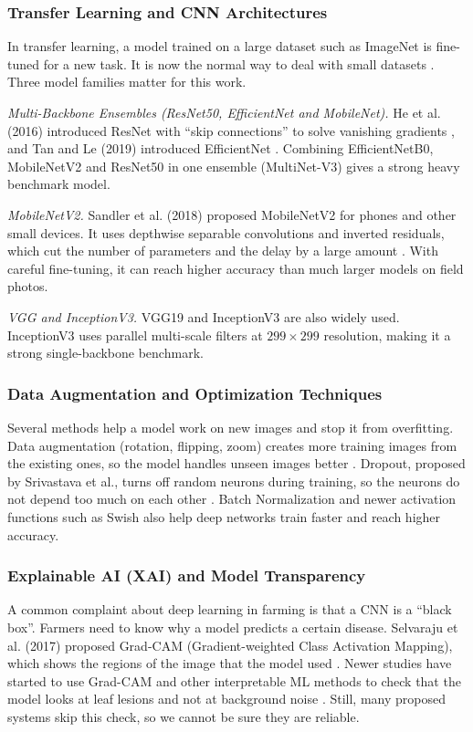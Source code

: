 \subsubsection{Transfer Learning and CNN Architectures}
In transfer learning, a model trained on a large dataset such as ImageNet is fine-tuned for a new task. It is now the normal way to deal with small datasets \cite{pan2010survey}. Three model families matter for this work.

\textit{Multi-Backbone Ensembles (ResNet50, EfficientNet and MobileNet).} He et al. (2016) introduced ResNet with ``skip connections'' to solve vanishing gradients \cite{he2016deep}, and Tan and Le (2019) introduced EfficientNet \cite{tan2019efficientnet}. Combining EfficientNetB0, MobileNetV2 and ResNet50 in one ensemble (MultiNet-V3) gives a strong heavy benchmark model.

\textit{MobileNetV2.} Sandler et al. (2018) proposed MobileNetV2 for phones and other small devices. It uses depthwise separable convolutions and inverted residuals, which cut the number of parameters and the delay by a large amount \cite{sandler2018mobilenetv2}. With careful fine-tuning, it can reach higher accuracy than much larger models on field photos.

\textit{VGG and InceptionV3.} VGG19 \cite{simonyan2015very} and InceptionV3 \cite{szegedy2016rethinking} are also widely used. InceptionV3 uses parallel multi-scale filters at $299 \times 299$ resolution, making it a strong single-backbone benchmark.

\subsubsection{Data Augmentation and Optimization Techniques}
Several methods help a model work on new images and stop it from overfitting. Data augmentation (rotation, flipping, zoom) creates more training images from the existing ones, so the model handles unseen images better \cite{shorten2019survey}. Dropout, proposed by Srivastava et al., turns off random neurons during training, so the neurons do not depend too much on each other \cite{srivastava2014dropout}. Batch Normalization \cite{ioffe2015batch} and newer activation functions such as Swish \cite{ramachandran2017swish} also help deep networks train faster and reach higher accuracy.

\subsubsection{Explainable AI (XAI) and Model Transparency}
A common complaint about deep learning in farming is that a CNN is a ``black box''. Farmers need to know why a model predicts a certain disease. Selvaraju et al. (2017) proposed Grad-CAM (Gradient-weighted Class Activation Mapping), which shows the regions of the image that the model used \cite{selvaraju2017grad}. Newer studies have started to use Grad-CAM and other interpretable ML methods to check that the model looks at leaf lesions and not at background noise \cite{ryo2022explainable}. Still, many proposed systems skip this check, so we cannot be sure they are reliable.

